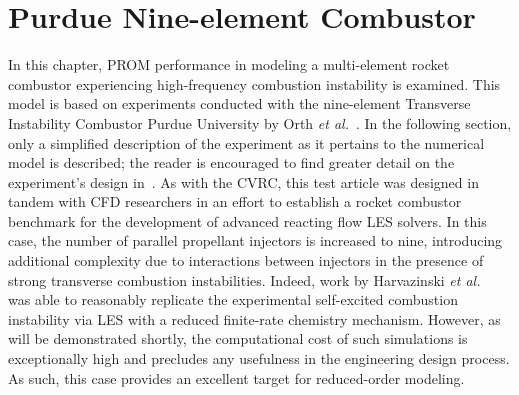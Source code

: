 \section{Purdue Nine-element Combustor}

In this chapter, PROM performance in modeling a multi-element rocket combustor experiencing high-frequency combustion instability is examined. This model is based on experiments conducted with the nine-element Transverse Instability Combustor Purdue University by Orth \textit{et al.}~\cite{Orth2018}. In the following section, only a simplified description of the experiment as it pertains to the numerical model is described; the reader is encouraged to find greater detail on the experiment's design in~\cite{Orth2018}. As with the CVRC, this test article was designed in tandem with CFD researchers in an effort to establish a rocket combustor benchmark for the development of advanced reacting flow LES solvers. In this case, the number of parallel propellant injectors is increased to nine, introducing additional complexity due to interactions between injectors in the presence of strong transverse combustion instabilities. Indeed, work by Harvazinski \textit{et al.}~\cite{Harvazinski2019} was able to reasonably replicate the experimental self-excited combustion instability via LES with a reduced finite-rate chemistry mechanism. However, as will be demonstrated shortly, the computational cost of such simulations is exceptionally high and precludes any usefulness in the engineering design process. As such, this case provides an excellent target for reduced-order modeling.


